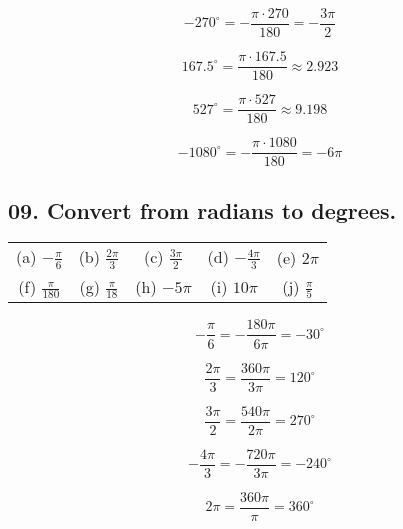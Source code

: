 \documentclass[12pt, a4paper]{article}
\begin{document}
\begin{equation}
	\tag{g}
	-270^\circ = -\frac{\pi\cdot270}{180} = -\frac{3\pi}{2}
\end{equation}

\begin{equation}
	\tag{h}
	167.5^\circ = \frac{\pi\cdot167.5}{180} \approx 2.923
\end{equation}

\begin{equation}
	\tag{i}
	527^\circ=\frac{\pi\cdot527}{180} \approx 9.198
\end{equation}

\begin{equation}
	\tag{j}
	-1080^\circ=-\frac{\pi\cdot1080}{180}=-6\pi
\end{equation}

\newpage\quad

\subsection*{09. Convert from radians to degrees.}

\begin{center}
\begin{tabular}{ c c c c c }
 (a) $-\frac{\pi}{6}$ & (b) $\frac{2\pi}{3}$ & (c) $\frac{3\pi}{2}$
 & (d) $-\frac{4\pi}{3}$ & (e) $2\pi$ \\
 
 (f) $\frac{\pi}{180}$ & (g) $\frac{\pi}{18}$ & (h) $-5\pi$
 & (i) $10\pi$ & (j) $\frac{\pi}{5}$  
\end{tabular}
\end{center}

\begin{equation}
	\tag{a}
	-\frac{\pi}{6} = -\frac{180\pi}{6\pi} = -30^\circ
\end{equation}

\begin{equation}
	\tag{b}
	\frac{2\pi}{3} = \frac{360\pi}{3\pi} = 120^\circ
\end{equation}

\begin{equation}
	\tag{c}
	\frac{3\pi}{2} = \frac{540\pi}{2\pi} = 270^\circ
\end{equation}

\begin{equation}
	\tag{d}
	-\frac{4\pi}{3} = -\frac{720\pi}{3\pi} = -240^\circ
\end{equation}

\begin{equation}
	\tag{e}
	2\pi = \frac{360\pi}{\pi} = 360^\circ
\end{equation}
\end{document}
